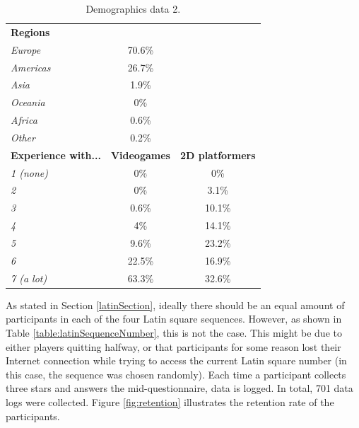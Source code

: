\begin{table} \centering
\small
\caption{Demographics data 2.}
\label{table:demographics2}
\begin{tabular}{lcc}
\toprule
\textbf{Regions}                      &                & \textbf{}               \\ 
\textit{Europe}                      & 70.6\%         &                         \\
\textit{Americas}                    & 26.7\%         &                         \\
\textit{Asia}                        & 1.9\%          &                         \\
\textit{Oceania}                     & 0\%            &                         \\
\textit{Africa}                      & 0.6\%          &                         \\
\textit{Other}                       & 0.2\%          &                         \\
\textbf{Experience with...} & \textbf{Videogames} & \textbf{2D platformers} \\
\textit{1 (none)}                           & 0\%            & 0\%                     \\
\textit{2}                           & 0\%            & 3.1\%                   \\ 
\textit{3}                           & 0.6\%          & 10.1\%                  \\
\textit{4}                           & 4\%            & 14.1\%                  \\ 
\textit{5}                           & 9.6\%          & 23.2\%                  \\ 
\textit{6}                           & 22.5\%         & 16.9\%                  \\
\textit{7 (a lot)}                           & 63.3\%         & 32.6\%                  \\
\bottomrule
\end{tabular}
\end{table}

As stated in Section \ref{latinSection}, ideally there should be an equal amount of participants in each of the four Latin square sequences. However, as shown in Table \ref{table:latinSequenceNumber}, this is not the case. This might be due to either players quitting halfway, or that participants for some reason lost their Internet connection while trying to access the current Latin square number (in this case, the sequence was chosen randomly). Each time a participant collects three stars and answers the mid-questionnaire, data is logged. In total, 701 data logs were collected. Figure \ref{fig:retention} illustrates the retention rate of the participants.

